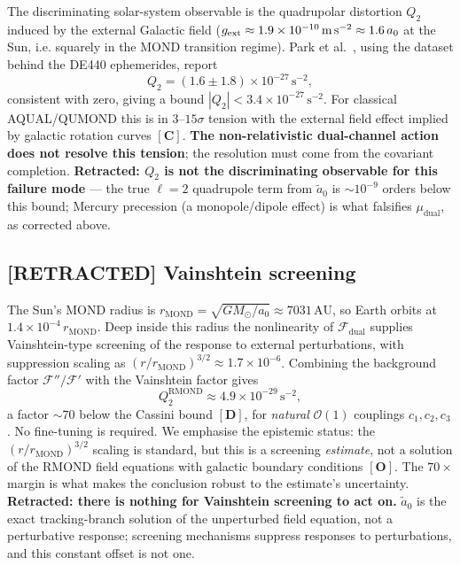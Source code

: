 \documentclass[aps,prd,preprint,superscriptaddress,nofootinbib,amsmath,amssymb,floatfix]{revtex4-2}
\makeatletter
\DeclareRobustCommand{\_}{%
    \ifmmode\nfss@text{\textunderscore}\else\textunderscore\penalty\z@\fi}%
\makeatother
\begin{document}
The discriminating solar-system observable is the quadrupolar distortion $Q_2$ induced by the external Galactic field ($g_{\text{ext}} \approx 1.9\times10^{-10}\,\text{m\,s}^{-2} \approx 1.6\,a_0$ at the Sun, i.e. squarely in the MOND transition regime). Park et al.~\cite{Park2026}, using the dataset behind the DE440 ephemerides, report
\begin{equation}
Q_2 = (1.6 \pm 1.8)\times10^{-27}\,\text{s}^{-2},
\end{equation}
consistent with zero, giving a bound $|Q_2| < 3.4\times10^{-27}\,\text{s}^{-2}$. For classical AQUAL/QUMOND this is in $3$--$15\sigma$ tension with the external field effect implied by galactic rotation curves $\mathbf{[C]}$. \textbf{The non-relativistic dual-channel action does not resolve this tension}; the resolution must come from the covariant completion. \textbf{Retracted: $Q_2$ is not the discriminating observable for this failure mode} — the true $\ell=2$ quadrupole term from $\tilde a_0$ is $\sim10^{-9}$ orders below this bound; Mercury precession (a monopole/dipole effect) is what falsifies $\mu_{\text{dual}}$, as corrected above.

\subsection*{[RETRACTED] Vainshtein screening}

The Sun's MOND radius is $r_{\text{MOND}} = \sqrt{GM_\odot/a_0} \approx 7031\,\text{AU}$, so Earth orbits at $1.4\times10^{-4}\,r_{\text{MOND}}$. Deep inside this radius the nonlinearity of $\mathcal{F}_{\text{dual}}$ supplies Vainshtein-type screening \cite{Vainshtein1972} of the response to external perturbations, with suppression scaling as $(r/r_{\text{MOND}})^{3/2} \approx 1.7\times10^{-6}$. Combining the background factor $\mathcal{F}''/\mathcal{F}'$ with the Vainshtein factor gives
\begin{equation}
Q_2^{\text{RMOND}} \approx 4.9\times10^{-29}\,\text{s}^{-2},
\end{equation}
a factor $\sim70$ below the Cassini bound $\mathbf{[D]}$, for \emph{natural} $\mathcal{O}(1)$ couplings $c_1,c_2,c_3$. No fine-tuning is required. We emphasise the epistemic status: the $(r/r_{\text{MOND}})^{3/2}$ scaling is standard, but this is a screening \emph{estimate}, not a solution of the RMOND field equations with galactic boundary conditions $\mathbf{[O]}$. The $70\times$ margin is what makes the conclusion robust to the estimate's uncertainty. \textbf{Retracted: there is nothing for Vainshtein screening to act on.} $\tilde a_0$ is the exact tracking-branch solution of the unperturbed field equation, not a perturbative response; screening mechanisms suppress responses to perturbations, and this constant offset is not one.
\end{document}
